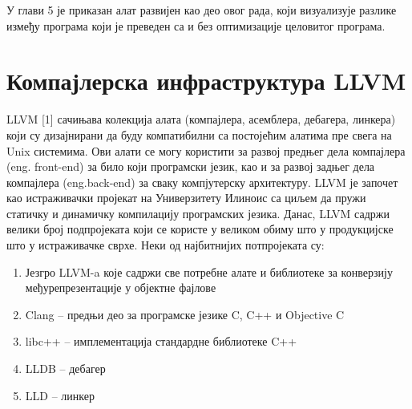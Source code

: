 \documentclass[12pt,oneside]{memoir}
\begin{document}
У глави 5 је приказан алат развијен као део овог рада, који визуализује разлике 
између програма који је преведен са и без оптимизације целовитог програма.

\chapter{Компајлерска инфраструктура LLVM}
\label{chp:LLVM}

LLVM [1]  сачињава колекција алата (компајлера, асемблера, дебагера, линкера)
који су дизајнирани да буду компатибилни са постојећим алатима пре свега на 
Unix системима.
Ови алати  се могу користити за развој предњег дела компајлера (eng. front-end)
 за било који програмски језик, 
као и за развој задњег дела компајлера (eng.back-end) за сваку компјутерску архитектуру.
LLVM је започет као истраживачки пројекат на Универзитету Илиноис са циљем да 
пружи статичку и динамичку компилацију програмских језика. 
Данас, LLVM садржи велики број подпројеката који се користе у великом обиму 
што у продукцијске што у истраживачке сврхе.
\newline Неки од најбитнијих потпројеката су:
\begin{enumerate}
\item Језгро LLVM-a које садржи све потребне алате и библиотеке за конверзију
међурепрезентације у објектне фајлове 
\item Clang -- предњи део за програмске језике C, C++ и Objective C
\item libc++ -- имплементација стандардне библиотеке C++
\item LLDB -- дебагер
\item LLD -- линкер
\end{enumerate}
\end{document}
